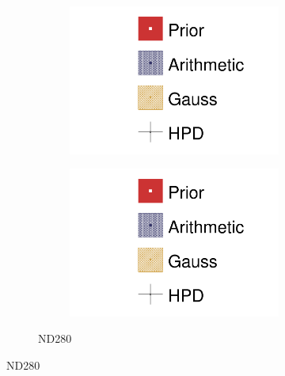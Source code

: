 \begin{figure}[h]
\begin{subfigure}[t]{\textwidth}
\begin{subfigure}[t]{0.24\textwidth}
		\includegraphics[width=\textwidth,page=4, trim={0mm 0mm 0mm 9mm}, clip]{figures/mach3/2018/asimov/2018a_MultiPi_Binningv6_NewCov_Asimov_NoDet_merge_drawPar}
	\end{subfigure}
	\begin{subfigure}[t]{0.24\textwidth}
		\includegraphics[width=\textwidth,page=5, trim={0mm 0mm 0mm 9mm}, clip]{figures/mach3/2018/asimov/2018a_MultiPi_Binningv6_NewCov_Asimov_NoDet_merge_drawPar}
	\end{subfigure}
\caption{ND280}
\end{subfigure}


\end{figure}
